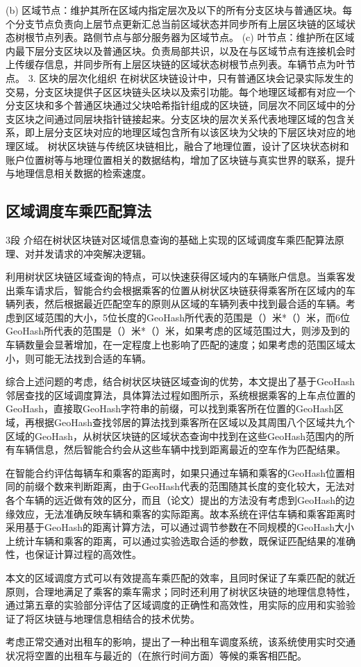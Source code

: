 (b) 区域节点：维护其所在区域内指定层次及以下的所有分支区块与普通区块。每个分支节点负责向上层节点更新汇总当前区域状态并同步所有上层区块链的区域状态树根节点列表。路侧节点与部分服务器为区域节点。
(c) 叶节点：维护所在区域内最下层分支区块以及普通区块。负责局部共识，以及在与区域节点有连接机会时上传缓存信息，并同步所有上层区块链的区域状态树根节点列表。车辆节点为叶节点。
3. 区块的层次化组织
在树状区块链设计中，只有普通区块会记录实际发生的交易，分支区块提供子区区块链头区块以及索引功能。每个地理区域都有对应一个分支区块和多个普通区块通过父块哈希指针组成的区块链，同层次不同区域中的分支区块之间通过同层块指针链接起来。分支区块的层次关系代表地理区域的包含关系，即上层分支区块对应的地理区域包含所有以该区块为父块的下层区块对应的地理区域。
树状区块链与传统区块链相比，融合了地理位置，设计了区块状态树和账户位置树等与地理位置相关的数据结构，增加了区块链与真实世界的联系，提升与地理信息相关数据的检索速度。

\subsection{区域调度车乘匹配算法}3段
介绍在树状区块链对区域信息查询的基础上实现的区域调度车乘匹配算法原理、对并发请求的冲突解决逻辑。

利用树状区块链区域查询的特点，可以快速获得区域内的车辆账户信息。当乘客发出乘车请求后，智能合约会根据乘客的位置从树状区块链获得乘客所在区域内的车辆列表，然后根据最近匹配空车的原则从区域的车辆列表中找到最合适的车辆。考虑到区域范围的大小，5位长度的GeoHash所代表的范围是（）米*（）米，而6位GeoHash所代表的范围是（）米*（）米，如果考虑的区域范围过大，则涉及到的车辆数量会显著增加，在一定程度上也影响了匹配的速度；如果考虑的范围区域太小，则可能无法找到合适的车辆。

综合上述问题的考虑，结合树状区块链区域查询的优势，本文提出了基于GeoHash邻居查找的区域调度算法，具体算法过程如图所示，系统根据乘客的上车点位置的GeoHash，直接取GeoHash字符串的前缀，可以找到乘客所在位置的GeoHash区域，再根据GeoHash查找邻居的算法找到乘客所在区域以及其周围八个区域共九个区域的GeoHash，从树状区块链的区域状态查询中找到在这些GeoHash范围内的所有车辆信息，然后智能合约会从这些车辆中找到距离最近的空车作为匹配结果。

在智能合约评估每辆车和乘客的距离时，如果只通过车辆和乘客的GeoHash位置相同的前缀个数来判断距离，由于GeoHash代表的范围随其长度的变化较大，无法对各个车辆的远近做有效的区分，而且（论文）提出的方法没有考虑到GeoHash的边缘效应，无法准确反映车辆和乘客的实际距离。故本系统在评估车辆和乘客距离时采用基于GeoHash的距离计算方法，可以通过调节参数在不同规模的GeoHash大小上统计车辆和乘客的距离，可以通过实验选取合适的参数，既保证匹配结果的准确性，也保证计算过程的高效性。

本文的区域调度方式可以有效提高车乘匹配的效率，且同时保证了车乘匹配的就近原则，合理地满足了乘客的乘车需求；同时还利用了树状区块链的地理信息特性，通过第五章的实验部分评估了区域调度的正确性和高效性，用实际的应用和实验验证了将区块链与地理信息相结合的技术优势。


考虑正常交通对出租车的影响，提出了一种出租车调度系统，该系统使用实时交通状况将空置的出租车与最近的（在旅行时间方面）等候的乘客相匹配。